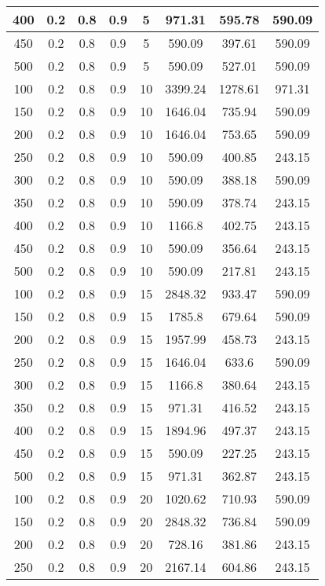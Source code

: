 \documentclass[a4paper, 12pt]{extreport}
\begin{document}
\begin{itemize}
\begin{longtable}{|c|c|c|c|c|c|c|c|}
			400 & 0.2 & 0.8 & 0.9 & 5 & 971.31 & 595.78 & 590.09 \\\hline
			450 & 0.2 & 0.8 & 0.9 & 5 & 590.09 & 397.61 & 590.09 \\\hline
			500 & 0.2 & 0.8 & 0.9 & 5 & 590.09 & 527.01 & 590.09 \\\hline
			100 & 0.2 & 0.8 & 0.9 & 10 & 3399.24 & 1278.61 & 971.31 \\\hline
			150 & 0.2 & 0.8 & 0.9 & 10 & 1646.04 & 735.94 & 590.09 \\\hline
			200 & 0.2 & 0.8 & 0.9 & 10 & 1646.04 & 753.65 & 590.09 \\\hline
			250 & 0.2 & 0.8 & 0.9 & 10 & 590.09 & 400.85 & 243.15 \\\hline
			300 & 0.2 & 0.8 & 0.9 & 10 & 590.09 & 388.18 & 590.09 \\\hline
			350 & 0.2 & 0.8 & 0.9 & 10 & 590.09 & 378.74 & 243.15 \\\hline
			400 & 0.2 & 0.8 & 0.9 & 10 & 1166.8 & 402.75 & 243.15 \\\hline
			450 & 0.2 & 0.8 & 0.9 & 10 & 590.09 & 356.64 & 243.15 \\\hline
			500 & 0.2 & 0.8 & 0.9 & 10 & 590.09 & 217.81 & 243.15 \\\hline
			100 & 0.2 & 0.8 & 0.9 & 15 & 2848.32 & 933.47 & 590.09 \\\hline
			150 & 0.2 & 0.8 & 0.9 & 15 & 1785.8 & 679.64 & 590.09 \\\hline
			200 & 0.2 & 0.8 & 0.9 & 15 & 1957.99 & 458.73 & 243.15 \\\hline
			250 & 0.2 & 0.8 & 0.9 & 15 & 1646.04 & 633.6 & 590.09 \\\hline
			300 & 0.2 & 0.8 & 0.9 & 15 & 1166.8 & 380.64 & 243.15 \\\hline
			350 & 0.2 & 0.8 & 0.9 & 15 & 971.31 & 416.52 & 243.15 \\\hline
			400 & 0.2 & 0.8 & 0.9 & 15 & 1894.96 & 497.37 & 243.15 \\\hline
			450 & 0.2 & 0.8 & 0.9 & 15 & 590.09 & 227.25 & 243.15 \\\hline
			500 & 0.2 & 0.8 & 0.9 & 15 & 971.31 & 362.87 & 243.15 \\\hline
			100 & 0.2 & 0.8 & 0.9 & 20 & 1020.62 & 710.93 & 590.09 \\\hline
			150 & 0.2 & 0.8 & 0.9 & 20 & 2848.32 & 736.84 & 590.09 \\\hline
			200 & 0.2 & 0.8 & 0.9 & 20 & 728.16 & 381.86 & 243.15 \\\hline
			250 & 0.2 & 0.8 & 0.9 & 20 & 2167.14 & 604.86 & 243.15 \\\hline

\end{longtable}
\end{itemize}
\end{document}
